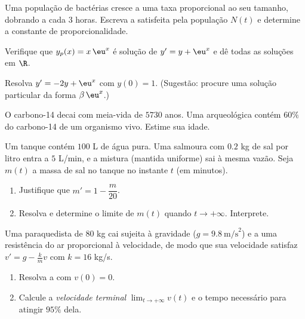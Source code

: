 \begin{exercise}[$\star$]\label{exo:g12:diffeq:2}
Uma população de bactérias cresce a uma taxa proporcional ao seu tamanho,
dobrando a cada $3$ horas. Escreva a  satisfeita pela
população $N(t)$ e determine a constante de proporcionalidade.
\end{exercise}

\begin{exercise}[$\star$]\label{exo:g12:diffeq:3}
Verifique que $y_p(x) = x\,\eu^{x}$ é solução de $y' = y + \eu^x$ e dê
todas as soluções em $\R$.
\end{exercise}

\begin{exercise}[$\star\star$]\label{exo:g12:diffeq:4}
Resolva $y' = -2y + \eu^{x}$ com $y(0) = 1$. (Sugestão: procure uma solução
particular da forma $\beta\,\eu^{x}$.)
\end{exercise}

\begin{exercise}[$\star\star$]\label{exo:g12:diffeq:5}
O carbono-14 decai com meia-vida de $5730$ anos. Uma  arqueológica
contém $60\%$ do carbono-14 de um organismo vivo. Estime sua idade.
\end{exercise}

\begin{exercise}[$\star\star$]\label{exo:g12:diffeq:6}
Um tanque contém $100$ L de água pura. Uma salmoura com $0.2$ kg de sal por
litro entra a $5$ L/min, e a mistura (mantida uniforme) sai à mesma vazão.
Seja $m(t)$ a massa de sal no tanque no instante $t$ (em minutos).
\begin{enumerate}
  \item Justifique que $m' = 1 - \dfrac{m}{20}$.
  \item Resolva e determine o limite de $m(t)$ quando $t \to +\infty$.
        Interprete.
\end{enumerate}
\end{exercise}

\begin{exercise}[$\star\star$]\label{exo:g12:diffeq:7}
Uma paraquedista de $80$ kg cai sujeita à gravidade
($g = 9.8\ \text{m/s}^2$) e a uma resistência do ar proporcional à
velocidade, de modo que sua velocidade satisfaz
$v' = g - \frac{k}{m}v$ com $k = 16$ kg/s.
\begin{enumerate}
  \item Resolva a  com $v(0) = 0$.
  \item Calcule a \emph{velocidade terminal} $\lim_{t\to+\infty} v(t)$ e o
        tempo necessário para atingir $95\%$ dela.
\end{enumerate}
\end{exercise}

